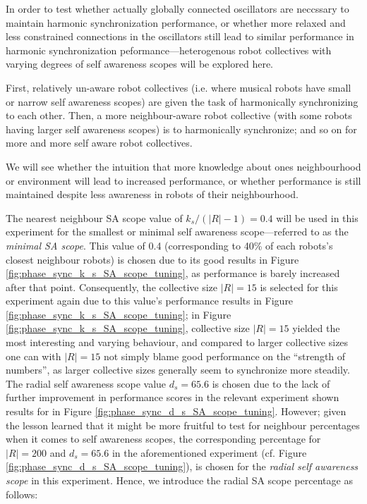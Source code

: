 			In order to test whether actually globally connected oscillators are neccssary to maintain harmonic synchronization performance, or whether more relaxed and less constrained connections in the oscillators still lead to similar performance in harmonic synchronization peformance—heterogenous robot collectives with varying degrees of self awareness scopes will be explored here.
			
			First, relatively un-aware robot collectives (i.e. where musical robots have small or narrow self awareness scopes) are given the task of harmonically synchronizing to each other. Then, a more neighbour-aware robot collective (with some robots having larger self awareness scopes) is to harmonically synchronize; and so on for more and more self aware robot collectives.
			
			We will see whether the intuition that more knowledge about ones neighbourhood or environment will lead to increased performance, or whether performance is still maintained despite less awareness in robots of their neighbourhood.
			
			The nearest neighbour SA scope value of $k_s/(|R|-1)=0.4$ will be used in this experiment for the smallest or minimal self awareness scope—referred to as the \textit{minimal SA scope}. This value of 0.4 (corresponding to 40\% of each robots's closest neighbour robots) is chosen due to its good results in Figure \ref{fig:phase_sync_k_s_SA_scope_tuning}, as performance is barely increased after that point. Consequently, the collective size $|R|=15$ is selected for this experiment again due to this value's performance results in Figure \ref{fig:phase_sync_k_s_SA_scope_tuning}; in Figure \ref{fig:phase_sync_k_s_SA_scope_tuning}, collective size $|R|=15$ yielded the most interesting and varying behaviour, and compared to larger collective sizes one can with $|R|=15$ not simply blame good performance on the ``strength of numbers'', as larger collective sizes generally seem to synchronize more steadily. The radial self awareness scope value $d_s=65.6$ is chosen due to the lack of further improvement in performance scores in the relevant experiment shown results for in Figure \ref{fig:phase_sync_d_s_SA_scope_tuning}. However; given the lesson learned that it might be more fruitful to test for neighbour percentages when it comes to self awareness scopes, the corresponding percentage for $|R|=200$ and $d_s=65.6$ in the aforementioned experiment (cf. Figure \ref{fig:phase_sync_d_s_SA_scope_tuning}), is chosen for the \textit{radial self awareness scope} in this experiment. Hence, we introduce the radial SA scope percentage as follows:
			
